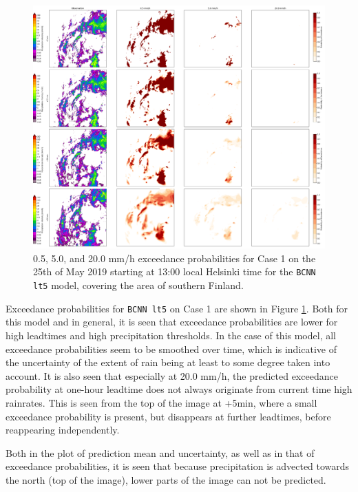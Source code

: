 \begin{figure}[H]
	\centering
	\includegraphics[width=\textwidth]{images/cases/bcnn_prob_case1}
	\caption{0.5, 5.0, and 20.0 mm/h exceedance probabilities for Case 1 on the 25th of May 2019 starting at 13:00 local Helsinki time for the \texttt{BCNN lt5} model, covering the area of southern Finland.}
	\label{fig:bcnn_prob_case1}
\end{figure}

Exceedance probabilities for \texttt{BCNN lt5} on Case 1 are shown in Figure \ref{fig:bcnn_prob_case1}. Both for this model and in general, it is seen that exceedance probabilities are lower for high leadtimes and high precipitation thresholds. In the case of this model, all exceedance probabilities seem to be smoothed over time, which is indicative of the uncertainty of the extent of rain being at least to some degree taken into account. It is also seen that especially at 20.0 mm/h, the predicted exceedance probability at one-hour leadtime does not always originate from current time high rainrates. This is seen from the top of the image at +5min, where a small exceedance probability is present, but disappears at further leadtimes, before reappearing independently. 



Both in the plot of prediction mean and uncertainty, as well as in that of exceedance probabilities, it is seen that because precipitation is advected towards the north (top of the image), lower parts of the image can not be predicted. 

